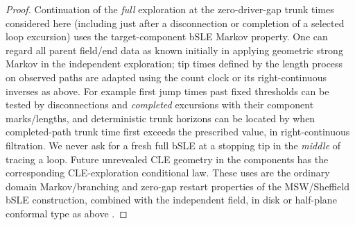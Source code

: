\begin{proof}
Continuation of the \emph{full} exploration at the zero-driver-gap trunk times considered here (including just after a disconnection or completion of a selected loop excursion) uses the target-component bSLE Markov property.
One can regard all parent field/end data as known initially in applying geometric strong Markov in the independent exploration; tip times defined by the length process on observed paths are adapted using the count clock or its right-continuous inverses as above.
For example first jump times past fixed thresholds can be tested by disconnections and \emph{completed} excursions with their component marks/lengths, and deterministic trunk horizons can be located by when completed-path trunk time first exceeds the prescribed value, in right-continuous filtration.
We never ask for a fresh full bSLE at a stopping tip in the \emph{middle} of tracing a loop.
Future unrevealed CLE geometry in the components has the corresponding CLE-exploration conditional law.
These uses are the ordinary domain Markov/branching and zero-gap restart properties of the MSW/Sheffield bSLE construction, combined with the independent field, in disk or half-plane conformal type as above \citep{MSWTrunk,MSWQuantum}.

\end{proof}

